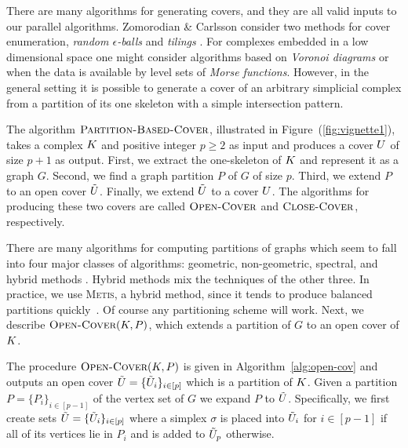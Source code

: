 There are many algorithms for generating covers, and they are all valid inputs to our parallel algorithms. 
Zomorodian \& Carlsson consider two methods for cover enumeration, \emph{random $\epsilon$-balls} 
and \emph{tilings} \cite{zc-lh-08}. For complexes embedded in a low dimensional space one might consider
algorithms based on \emph{Voronoi diagrams} or when the data is available by level sets of 
\emph{Morse functions}.  However, in the general setting it is possible to generate a cover of an 
arbitrary simplicial complex from a partition of its one skeleton with a simple intersection pattern.

The algorithm $\textnormal{\scshape Partition-Based-Cover}$, illustrated in Figure~(\ref{fig:vignette1}), takes a complex $K$ and positive 
integer $p \geq 2$ as input and produces a cover $U$ of size $p+1$ as output. 
First, we extract the one-skeleton of $K$ and represent it as a graph $G$. 
Second, we find a graph partition $P$ of $G$ of size $p$.  
Third, we extend $P$ to an open cover $\tilde{U}$. Finally, we extend $\tilde{U}$ to a cover $U$. The algorithms
for producing these two covers are called $\textnormal{\scshape Open-Cover}$ and
$\textnormal{\scshape Close-Cover}$, respectively. 

There are many algorithms for computing partitions of graphs which
seem to fall into four major classes of algorithms: geometric, non-geometric, 
spectral, and hybrid methods \cite{fj-gp-98}. Hybrid methods mix the techniques of the 
other three. In practice, we use \textsc{Metis}, a hybrid method, since it tends to produce balanced partitions quickly~\cite{KaKu95}. 
Of course any partitioning scheme will work. Next, we describe $\textnormal{\scshape Open-Cover}(K,P)$, which extends a partition of $G$ to an open cover of $K$. 

The procedure $\textnormal{\scshape Open-Cover}(K,P)$ is given in Algorithm~\ref{alg:open-cov} and outputs an open cover $\tilde{U} = \{\tilde{U}_i\}_{i \in [p]}$ which is a partition of $K$. Given a partition $P = \{P_i\}_{i \in [p-1]}$ of the vertex set of $G$ we expand $P$ to $\tilde{U}$. Specifically, we first create sets 
$\tilde{U} = \{\tilde{U}_i\}_{i \in [p]}$ where a simplex $\sigma$ is placed into $\tilde{U}_i$ for $i \in [p-1]$ 
if all of its vertices lie in $P_i$ and is added to $\tilde{U}_p$ otherwise. 

